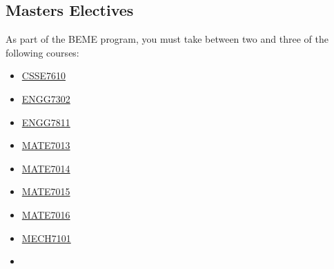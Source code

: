 \hypertarget{MASTERS}{\subsection{Masters Electives}}
As part of the BEME program, you must take between two and three of the following courses:
\begin{multicols}{3}
    \begin{itemize}
        \item \hyperlink{CSSE7610}{CSSE7610}
        \item \hyperlink{ENGG7302}{ENGG7302}
        \item \hyperlink{ENGG7811}{ENGG7811}
        \item \hyperlink{MATE7013}{MATE7013}
        \item \hyperlink{MATE7014}{MATE7014}
        \item \hyperlink{MATE7015}{MATE7015}
        \item \hyperlink{MATE7016}{MATE7016}
        \item \hyperlink{MECH7101}{MECH7101}
        \item[]
    \end{itemize}
\end{multicols}
